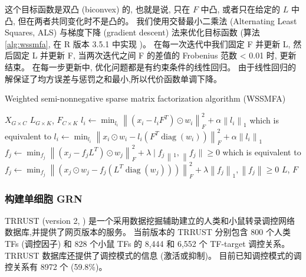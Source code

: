 这个目标函数是双凸 (biconvex) 的, 也就是说, 只在 $F$ 中凸, 或者只在给定的 $L$ 中凸, 但在两者共同变化时不是凸的。
我们使用交替最小二乘法 (Alternating Least Squares, ALS) 与梯度下降 (gradient descent) 法来优化目标函数 (算法 \ref{alg:wssmfa}, 
在 R 版本 3.5.1 中实现 \cite{goeman2012penalized,goeman2010l1})。
在每一次迭代中我们固定 F 并更新 L, 然后固定 L 并更新 F, 当两次迭代之间 F 的差值的 Frobenius 范数 < 0.01 时, 更新结束。
在每一步更新中, 优化问题都是有约束条件的线性回归。
由于线性回归的解保证了均方误差与惩罚之和最小,所以代价函数单调下降。
\begin{algorithm}
    \caption{Weighted semi-nonnegative sparse matrix factorization algorithm (WSSMFA)}
    \label{alg:wssmfa}
    \begin{algorithmic}[1]
    \Require  $X_{G \times C}$                                   
    \Ensure $L_{G \times K}$, $F_{C \times K}$                
                \State $l_{i} \leftarrow \min _{l_{i}}\left\|\left(x_{i}-l_{i} F^{T}\right) \odot w_{i}\right\|_{F}^{2}+\alpha\left\|l_{i}\right\|_{1}$
                \State which is equivalent to 
                \State $l_{i} \leftarrow \min _{l_{i}}\left\|x_{i} \odot w_{i}-l_{i}\left(F^{T} \operatorname{diag}\left(w_{i}\right)\right)\right\|_{F}^{2}+\alpha\left\|l_{i}\right\|_{1}$
            \EndFor
                \State $f_{j} \leftarrow \min _{f_{j}}\left\|\left(x_{j}-f_{j} L^{T}\right) \odot w_{j}\right\|_{F}^{2}+\lambda \mid f_{j}\left\|_{1},\right\| f_{j} \| \geq 0$
                \State which is equivalent to 
                \State $f_{j} \leftarrow \min _{f_{j}}\left\|\left(x_{j} \odot w_{j}-f_{j}\left(L^{T} \operatorname{diag}\left(w_{j}\right)\right)\right)\right\|_{F}^{2}+\lambda\left\|f_{j}\right\|_{1},\left\|f_{j}\right\| \geq 0$
            \EndFor
        \EndWhile  
        \State \Return $L$, $F$        
  \end{algorithmic}
\end{algorithm}

\subsubsection{构建单细胞 GRN}
TRRUST (version 2, \cite{han2018trrust}) 是一个采用数据挖掘辅助建立的人类和小鼠转录调控网络数据库,并提供了网页版本的服务。
当前版本的 TRRUST 分别包含 800 个人类 TFs (调控因子) 和 828 个小鼠 TFs 的 8,444 和 6,552 个 TF-target 调控关系。
TRRUST 数据库还提供了调控模式的信息 (激活或抑制)。
目前已知调控模式的调控关系有 8972 个 (59.8\%)。

